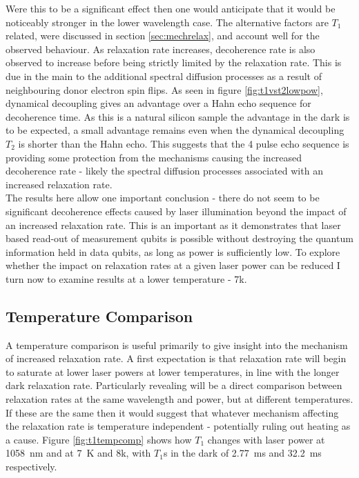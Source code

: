 Were this to be a significant effect then one would anticipate that it would be noticeably stronger in the lower wavelength case.
The alternative factors are $T_1$ related, were discussed in section \ref{sec:mechrelax}, and account well for the observed behaviour.
As relaxation rate increases, decoherence rate is also observed to increase before being strictly limited by the relaxation rate.
This is due in the main to the additional spectral diffusion processes as a result of neighbouring donor electron spin flips. 
As seen in figure \ref{fig:t1vst2lowpow}, dynamical decoupling gives an advantage over a Hahn echo sequence for decoherence time. 
As this is a natural silicon sample the advantage in the dark is to be expected, a small advantage remains even when the dynamical decoupling $T_2$ is shorter than the Hahn echo.
This suggests that the 4 pulse echo sequence is providing some protection from the mechanisms causing the increased decoherence rate - likely the spectral diffusion processes associated with an increased relaxation rate.
\\
The results here allow one important conclusion - there do not seem to be significant decoherence effects caused by laser illumination beyond the impact of an increased relaxation rate.
This is an important as it demonstrates that laser based read-out of measurement qubits is possible without destroying the quantum information held in data qubits, as long as power is sufficiently low.
To explore whether the impact on relaxation rates at a given laser power can be reduced I turn now to examine results at a lower temperature - 7k.

\subsection{Temperature Comparison}

A temperature comparison is useful primarily to give insight into the mechanism of increased relaxation rate.
A first expectation is that relaxation rate will begin to saturate at lower laser powers at lower temperatures, in line with the longer dark relaxation rate.
Particularly revealing will be a direct comparison between relaxation rates at the same wavelength and power, but at different temperatures.
If these are the same then it would suggest that whatever mechanism affecting the relaxation rate is temperature independent - potentially ruling out heating as a cause.
Figure \ref{fig:t1tempcomp} shows how $T_1$ changes with laser power at 1058~nm and at 7~K and 8k, with $T_1$s in the dark of 2.77~ms and 32.2~ms respectively.

